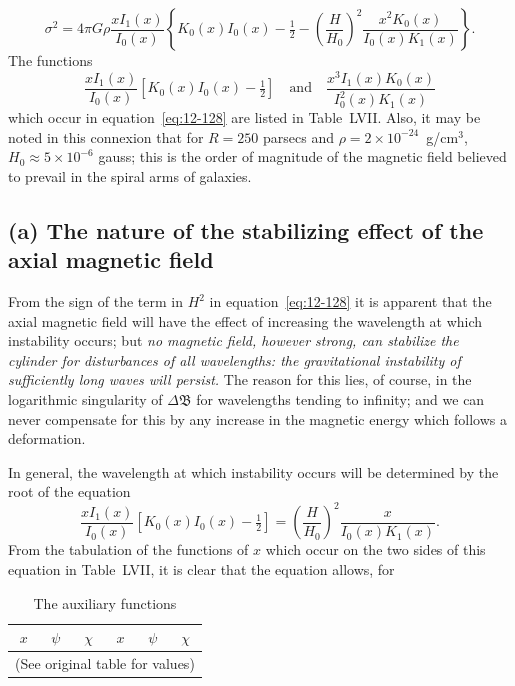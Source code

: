 \begin{equation}
\label{eq:12-128}
\sigma^2 = 4\pi G\rho \frac{xI_1(x)}{I_0(x)}\left\{K_0(x)I_0(x)-\tfrac{1}{2} - \left(\frac{H}{H_0}\right)^2 \frac{x^2 K_0(x)}{I_0(x)K_1(x)}\right\}.
\end{equation}
The functions
\begin{equation}
\label{eq:12-129}
\frac{xI_1(x)}{I_0(x)}\left[K_0(x)I_0(x)-\tfrac{1}{2}\right] \quad \text{and} \quad \frac{x^3 I_1(x)K_0(x)}{I_0^2(x)K_1(x)}
\end{equation}
which occur in equation~\eqref{eq:12-128} are listed in Table~LVII. Also, it may be noted in this connexion that for $R = 250$ parsecs and $\rho = 2 \times 10^{-24}$~g/cm$^3$, $H_0 \approx 5 \times 10^{-6}$ gauss; this is the order of magnitude of the magnetic field believed to prevail in the spiral arms of galaxies.

\subsection*{(a) The nature of the stabilizing effect of the axial magnetic field}

From the sign of the term in $H^2$ in equation~\eqref{eq:12-128} it is apparent that the axial magnetic field will have the effect of increasing the wavelength at which instability occurs; but \emph{no magnetic field, however strong, can stabilize the cylinder for disturbances of all wavelengths: the gravitational instability of sufficiently long waves will persist.} The reason for this lies, of course, in the logarithmic singularity of $\Delta\mathfrak{B}$ for wavelengths tending to infinity; and we can never compensate for this by any increase in the magnetic energy which follows a deformation.

In general, the wavelength at which instability occurs will be determined by the root of the equation
\begin{equation}
\label{eq:12-130}
\frac{xI_1(x)}{I_0(x)}\left[K_0(x)I_0(x)-\tfrac{1}{2}\right] = \left(\frac{H}{H_0}\right)^2 \frac{x}{I_0(x)K_1(x)}.
\end{equation}
From the tabulation of the functions of $x$ which occur on the two sides of this equation in Table~LVII, it is clear that the equation allows, for

\begin{table}[ht]
\centering
\caption{The auxiliary functions}
\label{tab:LVII}
\begin{tabular}{cccccc}
\hline
$x$ & $\psi$ & $\chi$ & $x$ & $\psi$ & $\chi$ \\
\hline
\multicolumn{6}{c}{(See original table for values)} \\
\hline
\end{tabular}
\end{table}

